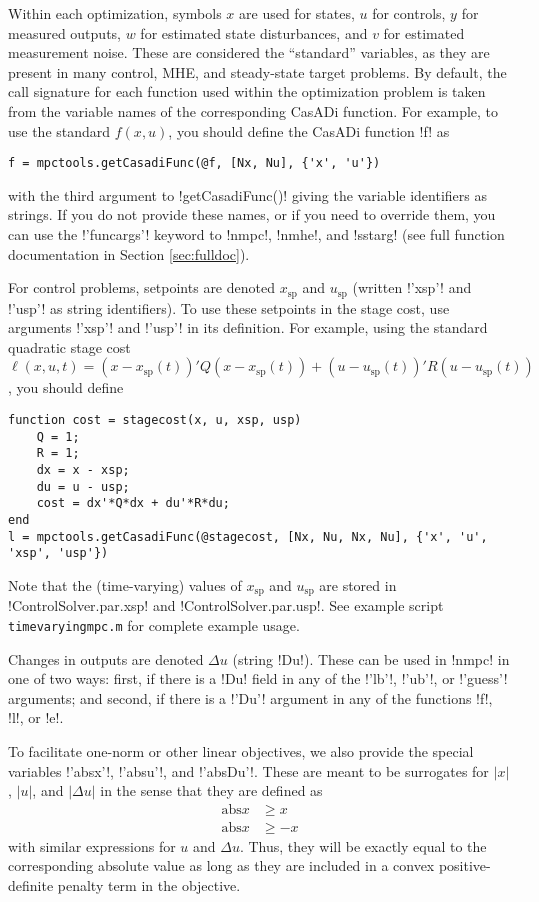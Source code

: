 \documentclass{article}
\newcommand{\casadi}{CasADi}
\providecommand{\lstinline}{}
\begin{document}
Within each optimization, symbols $x$ are used for states, $u$ for controls, $y$ for measured outputs, $w$ for estimated state disturbances, and $v$ for estimated measurement noise.
These are considered the ``standard'' variables, as they are present in many control, MHE, and steady-state target problems.
By default, the call signature for each function used within the optimization problem is taken from the variable names of the corresponding \casadi{} function.
For example, to use the standard $f(x,u)$, you should define the \casadi{} function \lstinline!f! as
%
\begin{lstlisting}
f = mpctools.getCasadiFunc(@f, [Nx, Nu], {'x', 'u'})
\end{lstlisting}
%
with the third argument to \lstinline!getCasadiFunc()! giving the variable identifiers as strings.
If you do not provide these names, or if you need to override them, you can use the \lstinline!'funcargs'! keyword to \lstinline!nmpc!, \lstinline!nmhe!, and \lstinline!sstarg! (see full function documentation in Section \ref{sec:fulldoc}).

For control problems, setpoints are denoted $x_\text{sp}$ and $u_\text{sp}$ (written \lstinline!'xsp'! and \lstinline!'usp'! as string identifiers).
To use these setpoints in the stage cost, use arguments \lstinline!'xsp'! and \lstinline!'usp'! in its definition.
For example, using the standard quadratic stage cost $\ell(x,u,t) = (x - x_\text{sp}(t))'Q(x - x_\text{sp}(t)) + (u - u_\text{sp}(t))'R(u - u_\text{sp}(t))$, you should define
%
\begin{lstlisting}
function cost = stagecost(x, u, xsp, usp)
    Q = 1;
    R = 1;
    dx = x - xsp;
    du = u - usp;
    cost = dx'*Q*dx + du'*R*du;
end
l = mpctools.getCasadiFunc(@stagecost, [Nx, Nu, Nx, Nu], {'x', 'u', 'xsp', 'usp'})
\end{lstlisting}
%
Note that the (time-varying) values of $x_\text{sp}$ and $u_\text{sp}$ are stored in \lstinline!ControlSolver.par.xsp! and \lstinline!ControlSolver.par.usp!.
See example script \texttt{timevaryingmpc.m} for complete example usage.

Changes in outputs are denoted $\Delta u$ (string \lstinline!Du!).
These can be used in \lstinline!nmpc! in one of two ways: first, if there is a \lstinline!Du! field in any of the \lstinline!'lb'!, \lstinline!'ub'!, or \lstinline!'guess'! arguments; and second, if there is a \lstinline!'Du'! argument in any of the functions \lstinline!f!, \lstinline!l!, or \lstinline!e!.

To facilitate one-norm or other linear objectives, we also provide the special variables \lstinline!'absx'!, \lstinline!'absu'!, and \lstinline!'absDu'!.
These are meant to be surrogates for $|x|$, $|u|$, and $|\Delta u|$ in the sense that they are defined as
%
\begin{align*}
    \text{abs}x & \ge x \\
    \text{abs}x & \ge -x
\end{align*}
%
with similar expressions for $u$ and $\Delta u$.
Thus, they will be exactly equal to the corresponding absolute value as long as they are included in a convex positive-definite penalty term in the objective.
\end{document}
